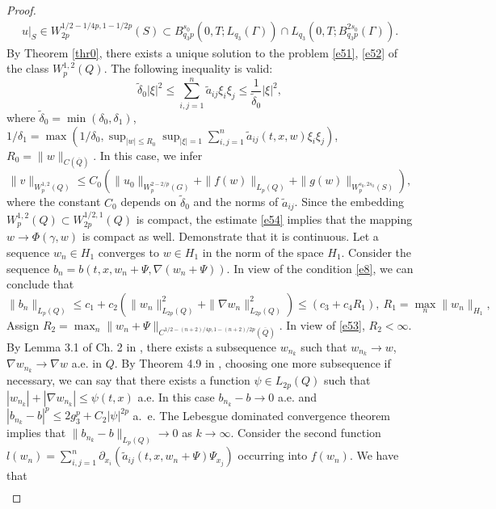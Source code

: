 \documentclass{article}
\theoremstyle{plain}
\begin{document}
\begin{proof}
\begin{multline}
u|_{S}\in W_{2p}^{1/2-1/4p,1-1/2p}(S)\subset  B_{q_3p}^{s_0}(0,T; L_{q_3}(\Gamma))\cap L_{q_3}(0,T; B_{q_3p}^{2s_0}(\Gamma)).
  \end{multline}
By Theorem  \ref{thr0}, there exists a unique solution 
 to the problem  \eqref{e51},  \eqref{e52} of the class  $W_p^{1,2}(Q)$. 
 The following inequality is valid: 
 $$
 \tilde{\delta}_0|\xi|^2\leq \sum_{i,j=1}^n \tilde{a}_{ij}\xi_i\xi_j \leq \frac{1}{\tilde{\delta}_0}|\xi|^2,
 $$
 where  $\tilde{\delta}_0=\min(\delta_0,\delta_1)$,  $1/\delta_1=\max(1/\delta_0,\sup_{|w|\leq R_0}\sup_{|\xi|=1}\sum_{i,j=1}^n \tilde{a}_{ij}(t,x,w)\xi_i\xi_j)$, $R_0=\|w\|_{C(\overline{Q})}$.
 In this case, we infer 
 \begin{equation}\label{e54}
 \|v\|_{W_{p}^{1,2}(Q)}\leq
C_{0}(\|u_{0}\|_{W_{p}^{2-2/p}(G)}+
\|f(w)\|_{L_{p}(Q)}+\|g(w)\|_{W_{p}^{s_{0},2s_{0}}(S)}),
\end{equation}
where the constant $C_0$ depends on   $\tilde{\delta}_0$ and the norms of  $\tilde{a}_{ij}$.
Since the embedding  $W_{p}^{1,2}(Q)\subset W_{2p}^{1/2,1}(Q)$  \cite[Theorem 7.5.2, Ch. 7]{ama} is compact,  the estimate \eqref{e54} implies that the mapping 
$w\to \Phi(\gamma,w) $ is compact as well. Demonstrate that it is continuous. Let a sequence  $w_n\in H_1$ converges to $w\in H_1$ in the norm of the space  $H_1$.
Consider the sequence  $b_n=b(t,x,w_n+\Psi,\nabla (w_n+\Psi))$. In view of the condition  \eqref{e8}, we can conclude that 
 \begin{equation}\label{e55}
 \|b_n\|_{L_{p}(Q)}\leq c_1+ c_2(\|w_n\|_{L_{2p}(Q)}^2+ \|\nabla w_n\|_{L_{2p}(Q)}^2)\leq (c_3+c_4R_1),\  R_1=\max_n\|w_n\|_{H_1}, 
\end{equation}
Assign   $R_2=\max_n \|w_n+\Psi\|_{C^{1/2-(n+2)/4p, 1-(n+2)/2p}(\overline{Q})}$.  In view of  \eqref{e53}, $R_2<\infty$. 
By Lemma 3.1 of Ch.  2 in \cite{lad}, there exists a subsequence  $w_{n_k}$ such that  $w_{n_k}\to w$, $\nabla w_{n_k}\to \nabla w$ a.e. in $Q$. 
By Theorem  4.9  in \cite{bre}, choosing one more subsequence if necessary, we can say that 
there exists a function  $\psi\in L_{2p}(Q)$ such that  $|w_{n_k}|+|\nabla w_{n_k}|\leq \psi(t,x)$ a.e.  
In this case  $b_{n_k}-b\to 0$ a.e. and $|b_{n_k}-b|^p\leq 2g_3^p+C_2 |\psi|^{2p} $ a.~e.  
The Lebesgue dominated convergence theorem implies that  $\|b_{n_k}-b\|_{L_{p}(Q)}\to 0$ as  $k\to \infty$. 
Consider the second function  $l(w_n)= \sum_{i,j=1}^n \partial_{x_i}( \tilde{a}_{ij}(t,x,w_n+\Psi)\Psi_{x_j})$ occurring into  $f(w_n)$.
We have that 
 \begin{multline*}

\end{multline*}
\end{proof}
\end{document}
